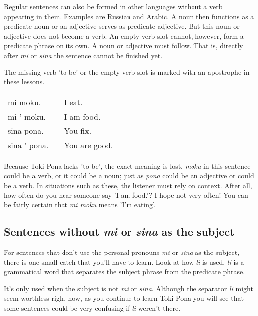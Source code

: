 Regular sentences can also be formed in other languages without a verb appearing in them. 
Examples are Russian and Arabic. 
A noun then functions as a predicate noun or an adjective serves as predicate adjective.
But this noun or adjective does not become a verb. 
An empty verb slot cannot, however, form a predicate phrase on its own. 
A noun or adjective must follow. 
That is, directly after \textit{mi} or \textit{sina} the sentence cannot be finished yet.

The missing verb 'to be' or the empty verb-slot is marked with an apostrophe in these lessons. 

\begin{supertabular}{p{5cm}|ll}
mi moku. && I eat.  \\
mi ' moku. && I am food. \\  
sina pona. && You fix. \\
sina ' pona. && You are good. \\  
\end{supertabular} 

Because Toki Pona lacks 'to be', the exact meaning is lost. 
\textit{moku} in this sentence could be a verb, or it could be a noun; just as \textit{pona} could be an adjective or could be a verb. 
In situations such as these, the listener must rely on context. 
After all, how often do you hear someone say 'I am food.'? 
I hope not very often! You can be fairly certain that \textit{mi moku} means 'I'm eating'. 
%
\subsection*{Sentences without \textit{mi} or \textit{sina} as the subject}
%
For sentences that don't use the personal pronouns \textit{mi} or \textit{sina} as the subject, there is one small catch that you'll have to learn. 
Look at how \textit{li} is used. 
\textit{\textit{li}} is a grammatical word that separates the subject phrase from the predicate phrase. 

It's only used when the subject is not \textit{mi} or \textit{sina}. 
Although the separator \textit{li} might seem worthless right now, as you continue to learn Toki Pona you will see that some sentences could be very confusing if \textit{li} weren't there. 

